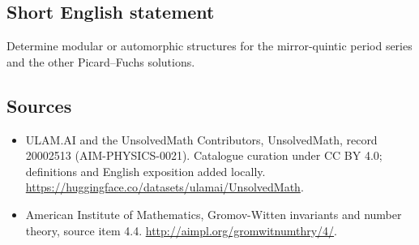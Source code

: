 \documentclass[11pt]{article}
\begin{document}
\subsection{Short English statement}
Determine modular or automorphic structures for the mirror-quintic period series and the other Picard–Fuchs solutions.
\subsection{Sources}
\begin{itemize}
\item[\hypertarget{source:20002513:1}{S1}] ULAM.AI and the UnsolvedMath Contributors, UnsolvedMath, record 20002513 (AIM-PHYSICS-0021). Catalogue curation under CC BY 4.0; definitions and English exposition added locally.
\url{https://huggingface.co/datasets/ulamai/UnsolvedMath}.
\item[\hypertarget{source:20002513:2}{S2}] American Institute of Mathematics, Gromov-Witten invariants and number theory, source item 4.4.
\url{http://aimpl.org/gromwitnumthry/4/}.
\end{itemize}
\label{end:20002513}
\end{document}
